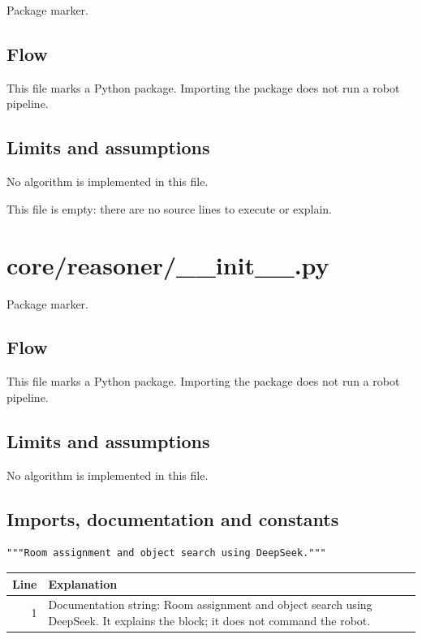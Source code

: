 \documentclass[11pt,a4paper]{book}
\begin{document}
Package marker.

\section*{Flow}

This file marks a Python package. Importing the package does not run a robot pipeline.

\section*{Limits and assumptions}

No algorithm is implemented in this file.

This file is empty: there are no source lines to execute or explain.

\chapter{core/reasoner/\_\_init\_\_.py}

Package marker.

\section*{Flow}

This file marks a Python package. Importing the package does not run a robot pipeline.

\section*{Limits and assumptions}

No algorithm is implemented in this file.

\section{Imports, documentation and constants}

\begin{lstlisting}[firstnumber=1]
"""Room assignment and object search using DeepSeek."""
\end{lstlisting}

\begin{longtable}{r p{}}

\textbf{Line} & \textbf{Explanation} \\ \hline \endhead

1 & Documentation string: Room assignment and object search using DeepSeek. It explains the block; it does not command the robot. \\

\end{longtable}
\end{document}

